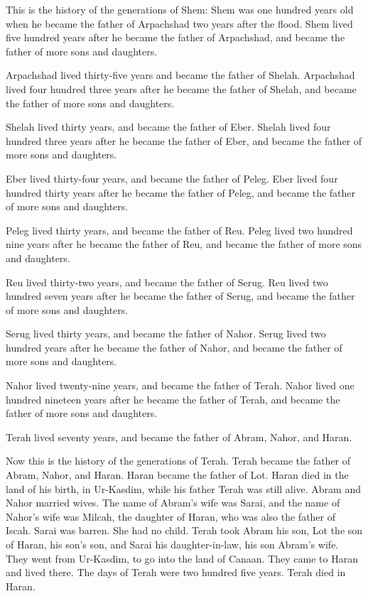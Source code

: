 \myverse{}This is the history of the generations of Shem: Shem was one hundred years old when he became the father of Arpachshad two years after the flood.  \myverse{}Shem lived five hundred years after he became the father of Arpachshad, and became the father of more sons and daughters.

\myverse{}Arpachshad lived thirty-five years and became the father of Shelah.  \myverse{}Ar\-pachshad lived four hundred three years after he became the father of Shelah, and became the father of more sons and daughters.

\myverse{}Shelah lived thirty years, and became the father of Eber.  \myverse{}Shelah lived four hundred three years after he became the father of Eber, and became the father of more sons and daughters.

\myverse{}Eber lived thirty-four years, and became the father of Peleg.  \myverse{}Eber lived four hundred thirty years after he became the father of Peleg, and became the father of more sons and daughters.

\myverse{}Peleg lived thirty years, and became the father of Reu.  \myverse{}Peleg lived two hundred nine years after he became the father of Reu, and became the father of more sons and daughters.

\myverse{}Reu lived thirty-two years, and became the father of Serug.  \myverse{}Reu lived two hundred seven years after he became the father of Serug, and became the father of more sons and daughters.

\myverse{}Serug lived thirty years, and became the father of Nahor.  \myverse{}Serug lived two hundred years after he became the father of Nahor, and became the father of more sons and daughters.

\myverse{}Nahor lived twenty-nine years, and became the father of Terah.  \myverse{}Nahor lived one hundred nineteen years after he became the father of Terah, and became the father of more sons and daughters.

\myverse{}Terah lived seventy years, and became the father of Abram, Nahor, and Haran.

\myverse{}Now this is the history of the generations of Terah. Terah became the father of Abram, Nahor, and Haran. Haran became the father of Lot.  \myverse{}Haran died in the land of his birth, in Ur-Kasdim, while his father Terah was still alive. \myverse{}Abram and Nahor married wives. The name of Abram’s wife was Sarai, and the name of Nahor’s wife was Milcah, the daughter of Haran, who was also the father of Iscah.  \myverse{}Sarai was barren. She had no child.  \myverse{}Terah took Abram his son, Lot the son of Haran, his son’s son, and Sarai his daughter-in-law, his son Abram’s wife. They went from Ur-Kasdim, to go into the land of Canaan. They came to Haran and lived there.  \myverse{}The days of Terah were two hundred five years. Terah died in Haran.

